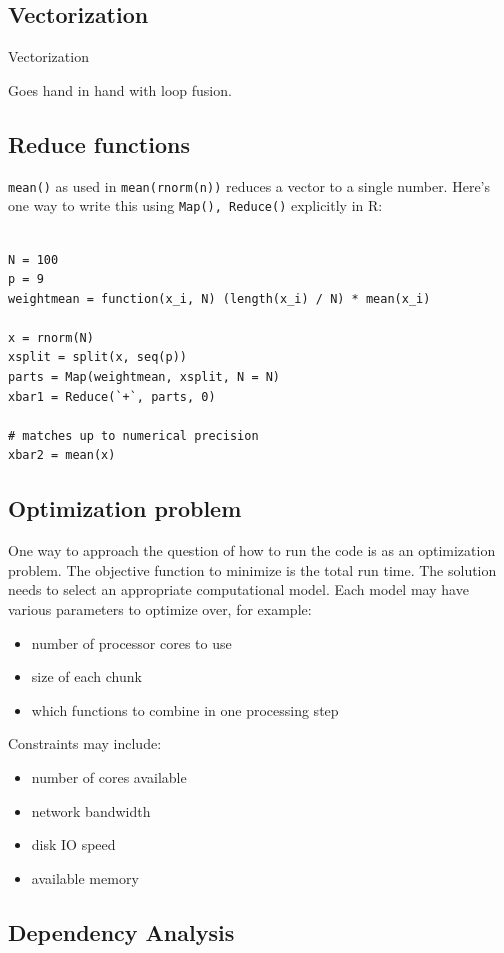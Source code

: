 \documentclass[12pt]{article}
\begin{document}
\subsection{Vectorization}

Vectorization

Goes hand in hand with loop fusion.


\subsection{Reduce functions}

\texttt{mean()} as used in \texttt{mean(rnorm(n))} reduces a vector to a
single number. Here's one way to write this using \texttt{Map(), Reduce()}
explicitly in R:

\begin{verbatim}

N = 100
p = 9
weightmean = function(x_i, N) (length(x_i) / N) * mean(x_i)

x = rnorm(N)
xsplit = split(x, seq(p))
parts = Map(weightmean, xsplit, N = N)
xbar1 = Reduce(`+`, parts, 0)

# matches up to numerical precision
xbar2 = mean(x)

\end{verbatim}

\subsection{Optimization problem}

One way to approach the question of how to run the code is as an
optimization problem. The objective function to minimize is the total run
time. The solution needs to select an appropriate computational model. Each
model may have various parameters to optimize over, for example:

\begin{itemize}
    \item number of processor cores to use
    \item size of each chunk
    \item which functions to combine in one processing step
\end{itemize}

Constraints may include:

\begin{itemize}
    \item number of cores available
    \item network bandwidth
    \item disk IO speed
    \item available memory
\end{itemize}

\subsection{Dependency Analysis}



 
\end{document}
